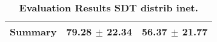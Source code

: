 \begin{table}[htb]
{\begin{tabular}{lll}
\midrule
\textbf{Summary                                  } &                  \phantom{0}79.28 $\pm$ 22.34 &                      \phantom{0}56.37 $\pm$ 21.77 \\
\bottomrule
\end{tabular}%
}
\caption{\textbf{Evaluation Results SDT distrib inet.}}
\label{tab:eval-results}
\end{table}
